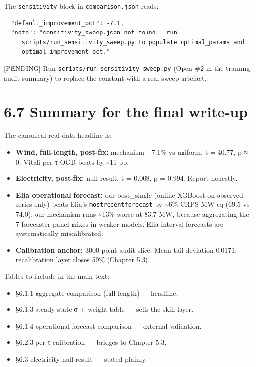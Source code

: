 \documentclass[11pt,a4paper,openany]{report}
\begin{document}
The \texttt{sensitivity} block in \texttt{comparison.json} reads:

\begin{verbatim}
  "default_improvement_pct": -7.1,
  "note": "sensitivity_sweep.json not found — run
     scripts/run_sensitivity_sweep.py to populate optimal_params and
     optimal_improvement_pct."
\end{verbatim}

[PENDING] Run \texttt{scripts/run\_sensitivity\_sweep.py} (Open \#2 in the
training-audit summary) to replace the constant with a real sweep
artefact.

\section{6.7 Summary for the final write-up}

The canonical real-data headline is:

\begin{itemize}
  \item \textbf{Wind, full-length, post-fix:} mechanism −7.1\% vs uniform, t = 40.77,
    p ≈ 0. Vitali per-τ OGD beats by \textasciitilde{}11 pp.
  \item \textbf{Electricity, post-fix:} null result, t = 0.008, p = 0.994. Report
    honestly.
  \item \textbf{Elia operational forecast:} our best\_single (online XGBoost on
    observed series only) beats Elia's \texttt{mostrecentforecast} by \textasciitilde{}6\%
    CRPS-MW-eq (69.5 vs 74.0); our mechanism runs \textasciitilde{}13\% worse at 83.7 MW,
    because aggregating the 7-forecaster panel mixes in weaker models.
    Elia interval forecasts are systematically miscalibrated.
  \item \textbf{Calibration anchor:} 3000-point audit slice. Mean tail deviation
    0.0171, recalibration layer closes 59\% (Chapter 5.3).
\end{itemize}

Tables to include in the main text:
\begin{itemize}
  \item §6.1.1 aggregate comparison (full-length) — headline.
  \item §6.1.3 steady-state σ + weight table — sells the skill layer.
  \item §6.1.4 operational-forecast comparison — external validation.
  \item §6.2.3 per-τ calibration — bridges to Chapter 5.3.
  \item §6.3 electricity null result — stated plainly.
\end{itemize}
\end{document}
